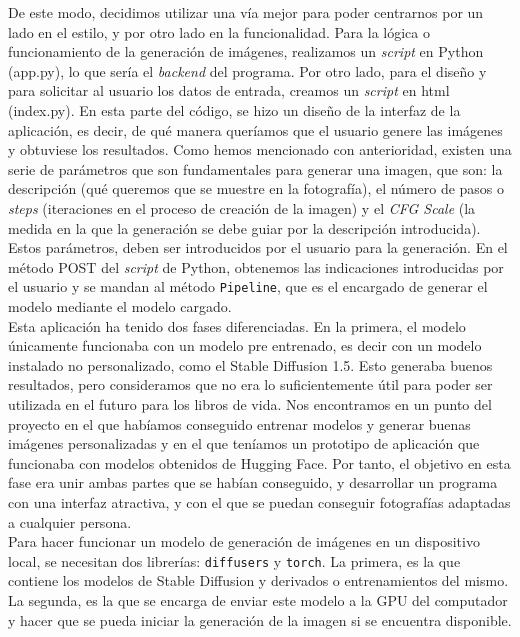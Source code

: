 De este modo, decidimos utilizar una vía mejor para poder centrarnos por un lado en el estilo, y por otro lado en la funcionalidad. Para la lógica o funcionamiento de la generación de imágenes, realizamos un \textit{script} en Python (app.py), lo que sería el \textit{backend} del programa. Por otro lado, para el diseño y para solicitar al usuario los datos de entrada, creamos un \textit{script} en html (index.py). En esta parte del código, se hizo un diseño de la interfaz de la aplicación, es decir, de qué manera queríamos que el usuario genere las imágenes y obtuviese los resultados. Como hemos mencionado con anterioridad, existen una serie de parámetros que son fundamentales para generar una imagen, que son: la descripción (qué queremos que se muestre en la fotografía), el número de pasos o \textit{steps} (iteraciones en el proceso de creación de la imagen) y el \textit{CFG Scale} (la medida en la que la generación se debe guiar por la descripción introducida). Estos parámetros, deben ser introducidos por el usuario para la generación. En el método POST del \textit{script} de Python, obtenemos las indicaciones introducidas por el usuario y se mandan al método \texttt{Pipeline}, que es el encargado de generar el modelo mediante el modelo cargado.\\

Esta aplicación ha tenido dos fases diferenciadas. En la primera, el modelo únicamente funcionaba con un modelo pre entrenado, es decir con un modelo instalado no personalizado, como el Stable Diffusion 1.5. Esto generaba buenos resultados, pero consideramos que no era lo suficientemente útil para poder ser utilizada en el futuro para los libros de vida. Nos encontramos en un punto del proyecto en el que habíamos conseguido entrenar modelos y generar buenas imágenes personalizadas y en el que teníamos un prototipo de aplicación que funcionaba con modelos obtenidos de Hugging Face. Por tanto, el objetivo en esta fase era unir ambas partes que se habían conseguido, y desarrollar un programa con una interfaz atractiva, y con el que se puedan conseguir fotografías adaptadas a cualquier persona. \\

Para hacer funcionar un modelo de generación de imágenes en un dispositivo local, se necesitan dos librerías: \texttt{diffusers} y \texttt{torch}. La primera, es la que contiene los modelos de Stable Diffusion y derivados o entrenamientos del mismo. La segunda, es la que se encarga de enviar este modelo a la GPU del computador y hacer que se pueda iniciar la generación de la imagen si se encuentra disponible. \\

